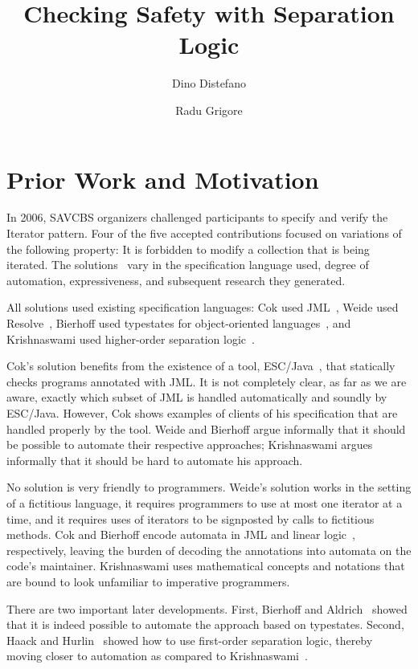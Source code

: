 \documentclass[a4paper]{article}
\title{Checking Safety with Separation Logic}
\author{Dino Distefano \and Radu Grigore}
\theoremstyle{slanted}
\theoremstyle{definition}
\theoremstyle{remark}
\begin{document}
\maketitle
\section{Prior Work and Motivation}

In 2006, SAVCBS organizers challenged participants to specify and verify the Iterator pattern.
Four of the five accepted contributions focused on variations of the following property:
It is forbidden to modify a collection that is being iterated.
The solutions~\cite{cok2006,weide2006,bierhoff2006,krishnaswami2006} vary in the specification language used, degree of automation, expressiveness, and subsequent research they generated.

All solutions used existing specification languages:
Cok used JML~\cite{jml}, Weide used Resolve~\cite{resolve}, Bierhoff used typestates for object-oriented languages~\cite{deline2004}, and Krishnaswami used higher-order separation logic~\cite{biering2007}.

Cok's solution benefits from the existence of a tool, ESC/Java~\cite{escjava}, that statically checks programs annotated with JML\null.
It is not completely clear, as far as we are aware, exactly which subset of JML is handled automatically and soundly by ESC/Java.
However, Cok shows examples of clients of his specification that are handled properly by the tool.
Weide and Bierhoff argue informally that it should be possible to automate their respective approaches;
Krishnaswami argues informally that it should be hard to automate his approach.

No solution is very friendly to programmers. 
Weide's solution works in the setting of a fictitious language, it requires programmers to use at most one iterator at a time, and it requires uses of iterators to be signposted by calls to fictitious methods.
Cok and Bierhoff encode automata in JML and linear logic~\cite{girard1987}, respectively, leaving the burden of decoding the annotations into automata on the code's maintainer.
Krishnaswami uses mathematical concepts and notations that are bound to look unfamiliar to imperative programmers.

There are two important later developments. First, Bierhoff and Aldrich~\cite{bierhoff2007} showed that it is indeed possible to automate the approach based on typestates. Second, Haack and Hurlin~\cite{haack2009} showed how to use first-order separation logic, thereby moving closer to automation as compared to Krishnaswami~\cite{krishnaswami2006}.
\end{document}
